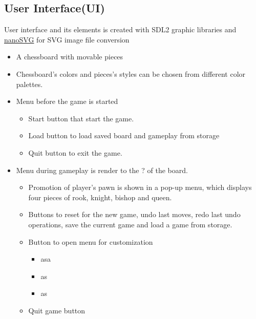\documentclass[a4paper, 10pt, titlepage]{article}
\begin{document}
\subsection{User Interface(UI)}
User interface and its elements is created with SDL2 graphic libraries and \href{https://github.com/memononen/nanosvg}{nanoSVG} for SVG image file conversion
\begin{itemize}
    \item A chessboard with movable pieces
    \item Chessboard's colors and pieces's styles can be chosen from different color palettes.

    \item Menu before the game is started
          \begin{itemize}
              \item Start button that start the game.
              \item Load button to load saved board and gameplay from storage
              \item Quit button to exit the game.
          \end{itemize}
    \item Menu during gameplay is render to the ? of the board.
          \begin{itemize}
              \item Promotion of player's pawn is shown in a pop-up menu, which displays four pieces of rook, knight, bishop and queen.
              \item Buttons to reset for the new game, undo last moves, redo last undo operations, save the current game and load a game from storage.
              \item Button to open menu for customization
                    \begin{itemize}
                        \item asa
                        \item as
                        \item as
                    \end{itemize}
              \item Quit game button
          \end{itemize}
\end{itemize}
\end{document}
